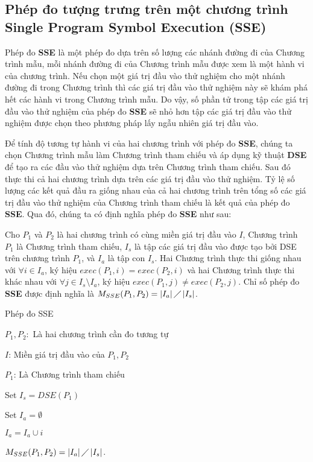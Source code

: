 \subsection{Phép đo tượng trưng trên một chương trình Single Program Symbol Execution (SSE)}
Phép đo \textbf{SSE} là một phép đo dựa trên số lượng các nhánh đường đi của Chương trình mẫu, mỗi nhánh đường đi của Chương trình mẫu được xem là một hành vi của chương trình. Nếu chọn một giá trị đầu vào thử nghiệm cho một nhánh đường đi trong Chương trình thì các giá trị đầu vào thử nghiệm này sẽ khám phá hết các hành vi trong Chương trình mẫu. Do vậy, số phần tử trong tập các giá trị đầu vào thử nghiệm của phép đo \textbf{SSE} sẽ nhỏ hơn tập các giá trị đầu vào thử nghiệm được chọn theo phương pháp lấy ngẫu nhiên giá trị đầu vào. 

Để tính độ tương tự hành vi của hai chương trình với phép đo \textbf{SSE}, chúng ta chọn Chương trình mẫu làm Chương trình tham chiếu và áp dụng kỹ thuật \textbf{DSE} để tạo ra các đầu vào thử nghiệm dựa trên Chương trình tham chiếu. Sau đó thực thi cả hai chương trình dựa trên các giá trị đầu vào thử nghiệm. Tỷ lệ số lượng các kết quả đầu ra giống nhau của cả hai chương trình trên tổng số các giá trị đầu vào thử nghiệm của Chương trình tham chiếu là kết quả của phép đo \textbf{SSE}. Qua đó, chúng ta có định nghĩa phép đo \textbf{SSE} như sau:

\begin{definition}
  Cho $P_{1}$ và $P_{2}$ là hai chương trình có cùng miền giá trị đầu
  vào $I$, Chương trình $P_{1}$ là Chương trình tham chiếu, $I_{s}$ là
  tập các giá trị đầu vào được tạo bởi DSE trên chương trình $P_{1}$,
  và $I_{a}$ là tập con $I_{s}$. Hai Chương trình thực thi giống nhau
  với $\forall i \in I_{a}$, ký hiệu $exec(P_{1}, i) = exec(P_{2}, i)$
  và hai Chương trình thực thi khác nhau với
  $\forall j \in I_{s} \setminus I_{a}$, ký hiệu
  $exec(P_{1}, j) \neq exec(P_{2}, j)$. Chỉ số phép đo \textbf{SSE}
  được định nghĩa là
  $M_{SSE}(P_{1}, P_{2}) = \left|I_{a}\right| \diagup
  \left|I_{s}\right| $.
\end{definition}

\begin{algorithm}[H]
	\caption{Phép đo SSE}
	\begin{algorithmic}	
		\item $P_{1}, P_{2}:$ Là hai chương trình cần đo tương tự
		\item $I$: Miền giá trị đầu vào của $P_{1}, P_{2}$
		\item $P_{1}$: Là Chương trình tham chiếu
		\item Set $I_{s} = DSE(P_{1})$ 
		\item Set $I_{a} = \emptyset$ 
		  
		
		\State $I_{a} = I_{a} \cup i$		
		\EndIf
		\EndWhile
		\item $M_{SSE}(P_{1}, P_{2}) = \left|I_{a}\right| \diagup \left|I_{s}\right| $. 
	\end{algorithmic}
\end{algorithm}

